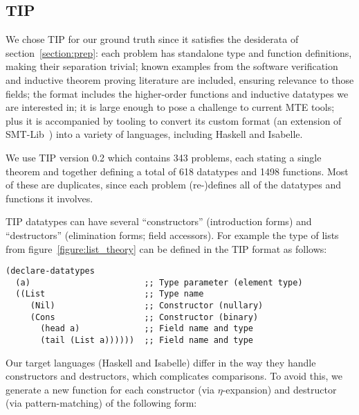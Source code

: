 \subsection{TIP}

We chose TIP for our ground truth since it satisfies the desiderata of
section~\ref{section:prep}: each problem has standalone type and function
definitions, making their separation trivial; known examples from the software
verification and inductive theorem proving literature are included, ensuring
relevance to those fields; the format includes the higher-order functions and
inductive datatypes we are interested in; it is large enough to pose a challenge
to current MTE tools; plus it is accompanied by tooling to convert its custom
format (an extension of SMT-Lib~\cite{BarFT-SMTLIB}) into a variety of
languages, including Haskell and Isabelle.

We use TIP version 0.2 which contains 343 problems, each stating a single
theorem and together defining a total of 618 datatypes and 1498 functions. Most
of these are duplicates, since each problem (re\nobreakdash-)defines all of the
datatypes and functions it involves.

TIP datatypes can have several ``constructors'' (introduction forms) and
``destructors'' (elimination forms; field accessors). For example the type of
lists from figure~\ref{figure:list_theory} can be defined in the TIP format as
follows:

\begin{samepage}
\begin{verbatim}
(declare-datatypes
  (a)                       ;; Type parameter (element type)
  ((List                    ;; Type name
     (Nil)                  ;; Constructor (nullary)
     (Cons                  ;; Constructor (binary)
       (head a)             ;; Field name and type
       (tail (List a))))))  ;; Field name and type
\end{verbatim}
\end{samepage}

Our target languages (Haskell and Isabelle) differ in the way they handle
constructors and destructors, which complicates comparisons. To avoid this, we
generate a new function for each constructor (via $\eta$-expansion) and
destructor (via pattern-matching) of the following form:

